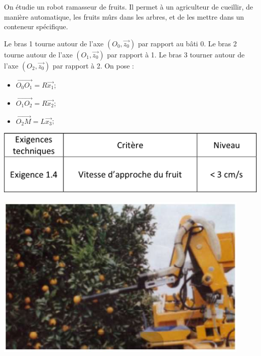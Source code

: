 On étudie un robot ramasseur de fruits. Il permet à un agriculteur de cueillir, de manière automatique, les fruits mûrs dans les arbres, et de les mettre dans un conteneur spécifique. 

Le bras 1 tourne autour de l'axe $(O_0,\overrightarrow{z_0})$ par rapport au bâti 0. Le bras 2 tourne autour de l'axe $(O_1,\overrightarrow{z_0})$ par rapport à 1. Le bras 3 tourner autour de l'axe $(O_2,\overrightarrow{z_0})$ par rapport à 2. On pose :
\begin{itemize}
\item $\overrightarrow{O_0O_1} = R\overrightarrow{x_1}$;
\item $\overrightarrow{O_1O_2} = R\overrightarrow{x_2}$;
\item $\overrightarrow{O_2M} = L\overrightarrow{x_3}$;
\end{itemize}

\begin{minipage}[c]{.47\linewidth}
\begin{center}
\includegraphics[width=.9\textwidth]{png/fig1}
\end{center}
\end{minipage}\hfill
\begin{minipage}[c]{.47\linewidth}
\begin{center}
\includegraphics[width=.9\textwidth]{png/fig2}
\end{center}
\end{minipage}


